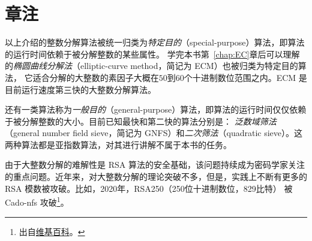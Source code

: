 \section*{章注}
以上介绍的整数分解算法被统一归类为\emph{特定目的}（special-purpose）算法，即算法的运行时间依赖于被分解整数的某些属性。
学完本书第~\ref{chap:EC}章后可以理解的\emph{椭圆曲线分解法}（elliptic-curve method，简记为 ECM）也被归类为特定目的算法，
它适合分解的大整数的素因子大概在$50$到$60$个十进制数位范围之内。ECM 是目前运行速度第三快的大整数分解算法。

还有一类算法称为\emph{一般目的}（general-purpose）算法，即算法的运行时间仅仅依赖于被分解整数的大小。目前已知最快和第二快的算法分别是：
\emph{泛数域筛法}（general number field sieve，简记为 GNFS）和\emph{二次筛法}（quadratic sieve）。这两种算法都是亚指数算法，对其进行讲解不属于本书的任务。

由于大整数分解的难解性是 RSA 算法的安全基础，该问题持续成为密码学家关注的重点问题。近年来，对大整数分解的理论突破不多，但是，实践上不断有更多的
RSA 模数被攻破。比如，2020年，RSA250（250位十进制数位，829比特）
被 Cado-nfs 攻破\footnote{出自\href{https://en.wikipedia.org/wiki/RSA_Factoring_Challenge}{维基百科}。}。

